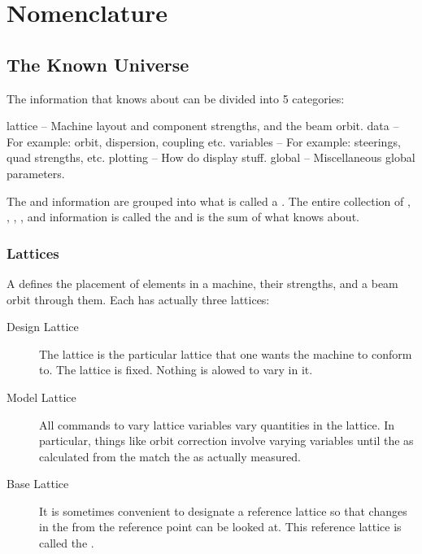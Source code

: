 \chapter{Nomenclature}
\label{c:nomenclature}

\section{The Known Universe}

The information that \tao knows about can be divided into 5 categories: 
\begin{example}
  lattice   -- Machine layout and component strengths, and the beam orbit.
  data      -- For example: orbit, dispersion, coupling etc.
  variables -- For example: steerings, quad strengths, etc.
  plotting  -- How do display stuff.
  global    -- Miscellaneous global parameters.
\end{example}
The  and  information are grouped into what is called a
. The entire collection of , ,
, , and  information is called
the  and is the sum of what \tao knows about.

\subsection{Lattices}

A  defines the placement of elements in a machine, their
strengths, and a beam orbit through them. Each 
has actually three lattices:
  \vspace*{-3ex}
  \begin{description}
  \item[Design Lattice] \Newline 
The  lattice is the particular lattice that one wants the
machine to conform to. The  lattice is fixed. Nothing is
alowed to vary in it.
  \item[Model Lattice] \Newline
All \tao commands to vary lattice variables vary quantities in the
 lattice. In particular, things like orbit correction
involve varying  variables until the  as calculated
from the  match the  as actually measured.
  \item[Base Lattice] \Newline
It is sometimes convenient to designate a reference lattice so that
changes in the  from the reference point can be looked at.
This reference lattice is called the .
  \end{description}

